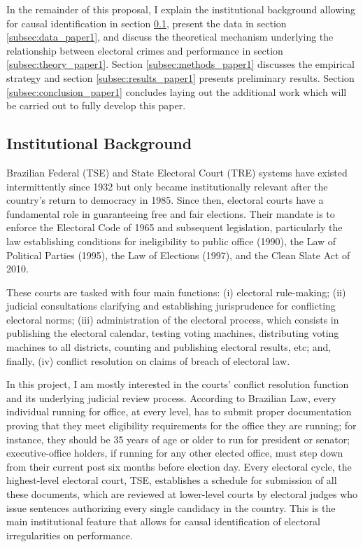 \documentclass[11pt]{article}
\begin{document}
In the remainder of this proposal, I explain the institutional background allowing for causal identification in section \ref{subsec:background_paper1}, present the data in section \ref{subsec:data_paper1}, and discuss the theoretical mechanism underlying the relationship between electoral crimes and performance in section \ref{subsec:theory_paper1}. Section \ref{subsec:methods_paper1} discusses the empirical strategy and section \ref{subsec:results_paper1} presents preliminary results. Section \ref{subsec:conclusion_paper1} concludes laying out the additional work which will be carried out to fully develop this paper.

\subsection{Institutional Background} \label{subsec:background_paper1}

Brazilian Federal (TSE) and State Electoral Court (TRE) systems have existed intermittently since 1932 but only became institutionally relevant after the country's return to democracy in 1985. Since then, electoral courts have a fundamental role in guaranteeing free and fair elections. Their mandate is to enforce the Electoral Code of 1965 and subsequent legislation, particularly the law establishing conditions for ineligibility to public office (1990), the Law of Political Parties (1995), the Law of Elections (1997), and the Clean Slate Act of 2010.

These courts are tasked with four main functions: (i) electoral rule-making; (ii) judicial consultations clarifying and establishing jurisprudence for conflicting electoral norms; (iii) administration of the electoral process, which consists in publishing the electoral calendar, testing voting machines, distributing voting machines to all districts, counting and publishing electoral results, etc; and, finally, (iv) conflict resolution on claims of breach of electoral law.

In this project, I am mostly interested in the courts' conflict resolution function and its underlying judicial review process. According to Brazilian Law, every individual running for office, at every level, has to submit proper documentation proving that they meet eligibility requirements for the office they are running; for instance, they should be 35 years of age or older to run for president or senator; executive-office holders, if running for any other elected office, must step down from their current post six months before election day. Every electoral cycle, the highest-level electoral court, TSE, establishes a schedule for submission of all these documents, which are reviewed at lower-level courts by electoral judges who issue sentences authorizing every single candidacy in the country. This is the main institutional feature that allows for causal identification of electoral irregularities on performance.
\end{document}
